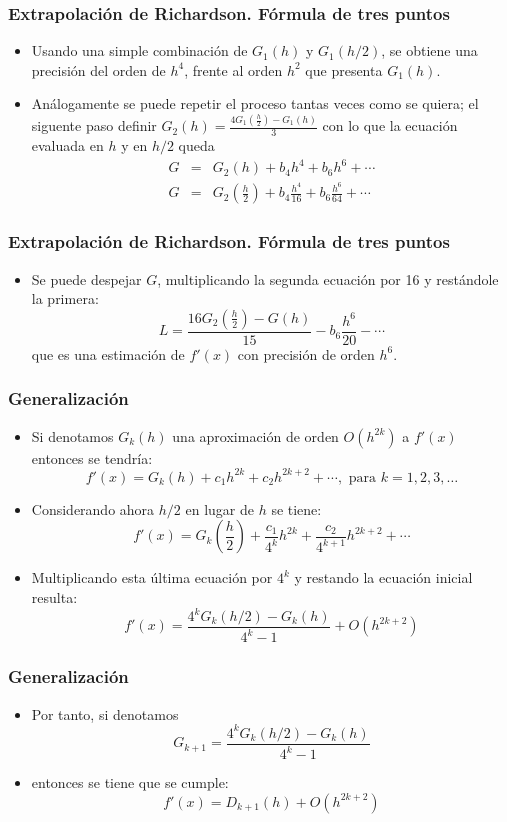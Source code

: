 \documentclass[12pt]{beamer}
\begin{document}
\frame
{
  \frametitle{Extrapolaci\'on de Richardson. F\'ormula de tres puntos}
  \begin{itemize}
    \item Usando una simple combinaci\'on de $G_1(h)$ y $G_1(h/2)$, se obtiene una precisi\'on del orden de $h^4$, frente al orden $h^2$ que presenta $G_1(h)$.
    \item<2-> An\'alogamente se puede repetir el proceso tantas veces como se quiera; el siguente paso definir $G_2(h)=\frac{4G_1\left(\frac{h}{2}\right)-G_1(h)}{3}$ con lo que la ecuaci\'on evaluada en $h$ y en $h/2$ queda
    \begin{eqnarray}
    G &=& G_2(h) + b_4h^4 + b_6h^6 + \cdots\nonumber\\
    G &=& G_2\left(\frac{h}{2}\right) + b_4\frac{h^4}{16} + b_6\frac{h^6}{64} + \cdots\nonumber
    \end{eqnarray}
\end{itemize}
}
\frame
{
  \frametitle{Extrapolaci\'on de Richardson. F\'ormula de tres puntos}
  \begin{itemize}
    \item Se puede despejar $G$, multiplicando la segunda ecuaci\'on por 16 y rest\'andole la primera:
    $$
    L = \frac{16G_2\left(\frac{h}{2}\right)-G(h)}{15} - b_6\frac{h^6}{20} -\cdots
    $$
    que es una estimaci\'on de $f'(x)$ con precisi\'on de orden $h^6$.
  \end{itemize}
}
\frame
{
\frametitle{Generalizaci\'on}
\begin{itemize}
\item Si denotamos $G_k(h)$ una aproximaci\'on de orden $O(h^{2k})$ a $f'(x)$ entonces se tendr\'ia:
$$
f'(x) = G_k(h) + c_1h^{2k} + c_2h^{2k+2} + \cdots,\text{ para }k = 1,2,3,\ldots
$$
\item<2-> Considerando ahora $h/2$ en lugar de $h$ se tiene:
$$
f'(x) = G_k\left(\frac{h}{2}\right) + \frac{c_1}{4^k}h^{2k} + \frac{c_2}{4^{k+1}}h^{2k+2} + \cdots
$$
\item<3-> Multiplicando esta \'ultima ecuaci\'on por $4^k$ y restando la ecuaci\'on inicial resulta:
$$
f'(x) = \frac{4^kG_k(h/2) - G_k(h)}{4^k-1} + O(h^{2k+2})
$$
\end{itemize}
}
\frame
{
  \frametitle{Generalizaci\'on}
  \begin{itemize}
    \item Por tanto, si denotamos 
    $$
    G_{k+1} = \frac{4^kG_k(h/2)-G_k(h)}{4^k-1}
    $$
    \item<2->entonces se tiene que se cumple:
    $$
    f'(x) = D_{k+1}(h) + O(h^{2k+2})
    $$
  \end{itemize}
}
\end{document}
